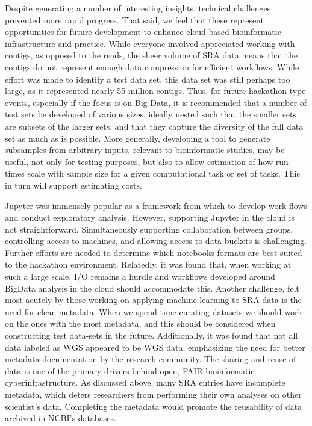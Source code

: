 Despite generating a number of interesting insights, technical challenges
prevented more rapid progress. That said, we feel that these represent
opportunities for future development to enhance cloud-based bioinformatic
infrastructure and practice. While everyone involved appreciated working with
contigs, as opposed to the reads, the sheer volume of SRA data means that the
contigs do not represent enough data compression for efficient workflows. While
effort was made to identify a test data set, this data set was still perhaps
too large, as it represented nearly 55 million contigs. Thus, for future
hackathon-type events, especially if the focus is on Big Data, it is
recommended that a number of test sets be developed of various sizes, ideally
nested such that the smaller sets are subsets of the larger sets, and that they
capture the diversity of the full data set as much as is possible. More
generally, developing a tool to generate subsamples from arbitrary inputs,
relevant to bioinformatic studies, may be useful, not only for testing
purposes, but also to allow estimation of how run times scale with sample size
for a given computational task or set of tasks. This in turn will support
estimating costs.

Jupyter was immensely popular as a framework from which to develop work-flows
and conduct exploratory analysis. However, supporting Jupyter in the cloud is
not straightforward. Simultaneously supporting collaboration between groups,
controlling access to machines, and allowing access to data buckets is
challenging. Further efforts are needed to determine which notebooks formats
are best suited to the hackathon environment. Relatedly, it was found that,
when working at such a large scale, I/O remains a hurdle and workflows
developed around BigData analysis in the cloud should accommodate this. Another
challenge, felt most acutely by those working on applying machine learning to
SRA data is the need for clean metadata. When we spend time curating datasets
we should work on the ones with the most metadata, and this should be
considered when constructing test data-sets in the future. Additionally, it was
found that not all data labeled as WGS appeared to be WGS data, emphasizing the
need for better metadata documentation by the research community. The sharing
and reuse of data is one of the primary drivers behind open, FAIR bioinformatic
cyberinfrastructure. As discussed above, many SRA entries have incomplete
metadata, which deters researchers from performing their own analyses on other
scientist’s data. Completing the metadata would promote the reusability of data
archived in NCBI’s databases.

